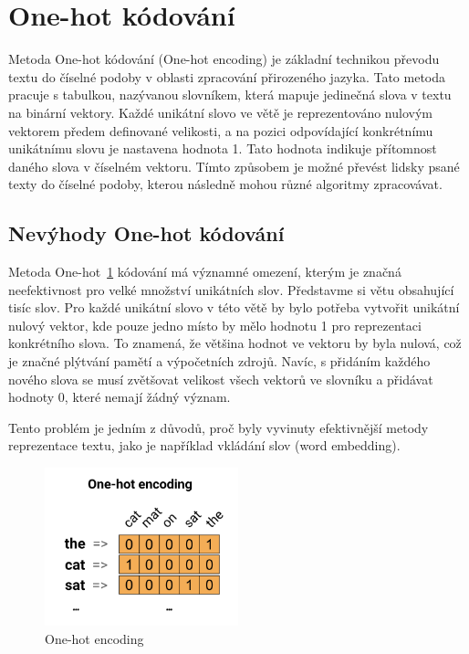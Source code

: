 \section{One-hot kódování}
Metoda One-hot kódování (One-hot encoding) je základní technikou převodu textu do číselné podoby v oblasti zpracování přirozeného jazyka.\@
Tato metoda pracuje s tabulkou, nazývanou slovníkem, která mapuje jedinečná slova v textu na binární vektory.
Každé unikátní slovo ve větě je reprezentováno nulovým vektorem předem definované velikosti, a na pozici odpovídající konkrétnímu unikátnímu slovu je nastavena hodnota 1.
Tato hodnota indikuje přítomnost daného slova v číselném vektoru. Tímto způsobem je možné převést lidsky psané texty do číselné podoby, kterou následně mohou různé algoritmy zpracovávat.

\subsection{Nevýhody One-hot kódování}
Metoda One-hot~\ref{fig:One-hot encoding} kódování má významné omezení, kterým je značná neefektivnost pro velké množství unikátních slov.
Představme si větu obsahující tisíc slov.
Pro každé unikátní slovo v této větě by bylo potřeba vytvořit unikátní nulový vektor, kde pouze jedno místo by mělo hodnotu 1 pro reprezentaci konkrétního slova.
To znamená, že většina hodnot ve vektoru by byla nulová, což je značné plýtvání pamětí a výpočetních zdrojů.
Navíc, s přidáním každého nového slova se musí zvětšovat velikost všech vektorů ve slovníku a přidávat hodnoty 0, které nemají žádný význam.

Tento problém je jedním z důvodů, proč byly vyvinuty efektivnější metody reprezentace textu, jako je například vkládání slov (word embedding).

\begin{figure}[H]
	\centering
	\includegraphics[width=0.5\textwidth]{Figures/one-hot.png}
	\caption{One-hot encoding~\cite{link5}}\label{fig:One-hot encoding}
\end{figure}

